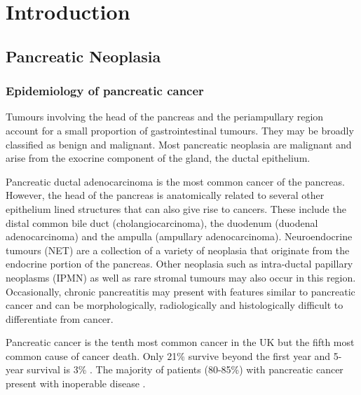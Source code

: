 
\chapter{Introduction}
\label{ch_intro}


\clearpage

\section{Pancreatic Neoplasia}

\subsection{Epidemiology of pancreatic cancer}
Tumours involving the head of the pancreas and the periampullary region account for a small proportion of gastrointestinal tumours. 
They may be broadly classified as benign and malignant. 
Most pancreatic neoplasia are malignant and arise from the exocrine component of the gland, the ductal epithelium. 

Pancreatic ductal adenocarcinoma is the most common cancer of the pancreas. 
However, the head of the pancreas is anatomically related to several other epithelium lined structures that can also give rise to cancers. 
These include the distal common bile duct (cholangiocarcinoma), the duodenum (duodenal adenocarcinoma) and the ampulla (ampullary adenocarcinoma). 
Neuroendocrine tumours (NET) are a collection of a variety of neoplasia that originate from the endocrine portion of the pancreas. 
Other neoplasia such as intra-ductal papillary neoplasms (IPMN) as well as rare stromal tumours may also occur in this region. 
Occasionally, chronic pancreatitis may present with features similar to pancreatic cancer and can be morphologically, radiologically and histologically difficult to differentiate from cancer.

Pancreatic cancer is the tenth most common cancer in the UK but the fifth most common cause of cancer death. 
Only 21\% survive beyond the first year and 5-year survival is 3\% \parencite{cancerresearchuk_cancer_2014}. 
The majority of patients (80-85\%) with pancreatic cancer present with inoperable disease \parencite{cancerresearchuk_cancer_2014,sener_pancreatic_1999}. 


